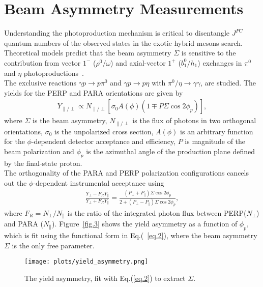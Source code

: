 \documentclass[a4paper]{jpconf}
\begin{document}
\section{Beam Asymmetry Measurements}
Understanding the photoproduction mechanism is critical to disentangle $J^{PC}$ quantum numbers of the observed states in the exotic hybrid mesons search. Theoretical models predict that the beam asymmetry $\Sigma$ is sensitive to the contribution from vector $1^{-}$ ($\rho^{0}/\omega$) and axial-vector $1^{+}$ ($b_{1}^{0}/h_{1}$) exchanges in $\pi^{0}$ and $\eta$ photoproductions~\cite{ref.4}.\\
The exclusive reactions $\gamma p \rightarrow p \pi^{0}$ and $\gamma p \rightarrow p \eta$ with $\pi^{0}/\eta\rightarrow \gamma\gamma$, are studied. The yields for the PERP and PARA orientations are given by
\begin{align}
Y_{\parallel/\perp} \propto N_{\parallel/\perp}[\sigma_{0}A(\phi)(1 \mp P \Sigma \cos 2\phi_{p})],
\label{eq.1}
\end{align}
where $\Sigma$ is the beam asymmetry, $N_{\parallel/\perp}$ is the flux of photons in two orthogonal orientations, $\sigma_{0}$ is the unpolarized cross section, $A(\phi)$ is an arbitrary function for the $\phi$-dependent detector acceptance and efficiency, $P$ is magnitude of the beam polarization and $\phi_{p}$ is the azimuthal angle of the production plane defined by the final-state proton.\\
The orthogonality of the PARA and PERP polarization configurations cancels out the $\phi$-dependent instrumental acceptance using
\begin{align}
\frac{Y_{\perp}-F_{R}Y_{\parallel}}{Y_{\perp}+F_{R}Y_{\parallel}} = \frac{(P_{\perp}+P_{\parallel})\Sigma \cos 2\phi_{p}}{2+(P_{\perp}-P_{\parallel})\Sigma \cos 2\phi_{p}},
\label{eq.2}
\end{align}
where $F_{R} = N_{\perp}/N_{\parallel}$ is the ratio of the integrated photon flux between PERP($N_{\perp}$) and PARA ($N_{\parallel}$). Figure~\ref{fig.3} shows the yield asymmetry as a function of $\phi_{p}$, which is fit using the functional form in Eq.(~\ref{eq.2}), where the beam asymmetry $\Sigma$ is the only free parameter.

\begin{figure}[h]
    \centering
    \texttt{[image: plots/yield\_asymmetry.png]}
    \caption{\label{fig.2}The yield asymmetry, fit with Eq.(\ref{eq.2}) to extract $\Sigma$.}
\end{figure}
\end{document}

